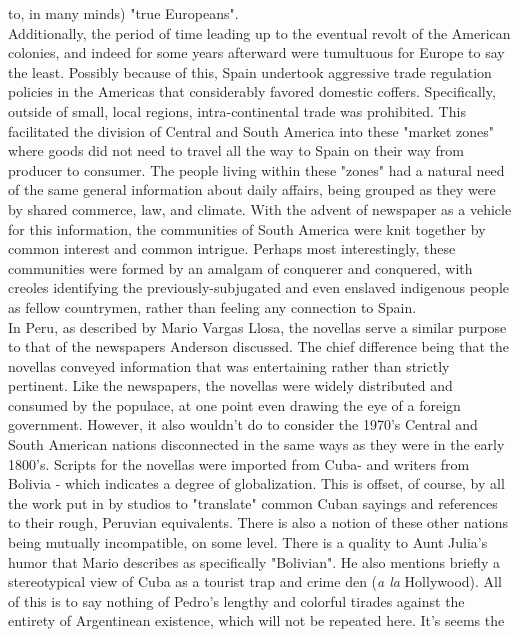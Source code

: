 \documentclass[12pt]{report}
\begin{document}
to, in many minds) "true Europeans".\\
\indent Additionally, the period of time
leading up to the eventual revolt of the American colonies, and indeed for
some years afterward were tumultuous for Europe to say the least. Possibly
because of this, Spain undertook aggressive trade regulation policies in
the Americas that considerably favored domestic coffers. Specifically,
outside of small, local regions, intra-continental trade was prohibited.
This facilitated the division of Central and South America into these
"market zones"\cite{bib:commie} where goods did not need to travel all the
way to Spain on their way from producer to consumer. The people living
within these "zones" had a natural need of the same general information
about daily affairs, being grouped as they were by shared commerce, law, and
climate. With the advent of newspaper as a vehicle for this information,
the communities of South America were knit together by common interest and
common intrigue. Perhaps most interestingly, these communities were formed
by an amalgam of conquerer and conquered, with creoles identifying the previously-subjugated and even enslaved indigenous people as fellow countrymen, rather than feeling any connection to Spain.\cite{bib:commie}\\
\indent In Peru, as described by Mario Vargas Llosa, the novellas serve a
similar purpose to that of the newspapers Anderson discussed. The chief
difference being that the novellas conveyed information that was
entertaining rather than strictly pertinent. Like the newspapers, the novellas were widely distributed and consumed by the populace, at one point even drawing the eye of a foreign government. However, it also wouldn't do to
consider the 1970's Central and South American nations disconnected in the
same ways as they were in the early 1800's. Scripts for the novellas were
imported from Cuba\cite{bib:main}- and writers from Bolivia - which
indicates a degree of globalization. This is offset, of course, by all the
work put in by studios to "translate" common Cuban sayings and references to
their rough, Peruvian equivalents. There is also a notion of these other
nations being mutually incompatible, on some level. There is a quality to
Aunt Julia's humor that Mario describes as specifically
"Bolivian"\cite{bib:main}. He also mentions briefly a stereotypical view of
Cuba as a tourist trap and crime den (\emph{a la} Hollywood). All of this is
to say nothing of Pedro's lengthy and colorful tirades against the entirety
of Argentinean existence, which will not be repeated here. It's seems the
\end{document}
